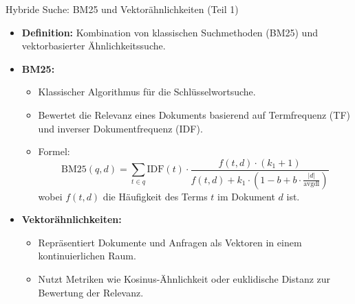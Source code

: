 \documentclass[aspectratio=1610, xcolor=dvipsnames, 9pt]{beamer}
\begin{document}
\begin{frame}{Hybride Suche: BM25 und Vektorähnlichkeiten (Teil 1)}
  \begin{itemize}
    \item \textbf{Definition:} Kombination von klassischen Suchmethoden (BM25) und vektorbasierter Ähnlichkeitssuche.
    \item \textbf{BM25:}
      \begin{itemize}
        \item Klassischer Algorithmus für die Schlüsselwortsuche.
        \item Bewertet die Relevanz eines Dokuments basierend auf Termfrequenz (TF) und inverser Dokumentfrequenz (IDF).
        \item Formel:
          \[
          \text{BM25}(q, d) = \sum_{t \in q} \text{IDF}(t) \cdot \frac{f(t, d) \cdot (k_1 + 1)}{f(t, d) + k_1 \cdot (1 - b + b \cdot \frac{|d|}{\text{avgdl}})}
          \]
          wobei \( f(t, d) \) die Häufigkeit des Terms \( t \) im Dokument \( d \) ist.
      \end{itemize}
    \item \textbf{Vektorähnlichkeiten:}
      \begin{itemize}
        \item Repräsentiert Dokumente und Anfragen als Vektoren in einem kontinuierlichen Raum.
        \item Nutzt Metriken wie Kosinus-Ähnlichkeit oder euklidische Distanz zur Bewertung der Relevanz.
      \end{itemize}
  \end{itemize}
\end{frame}
\end{document}
